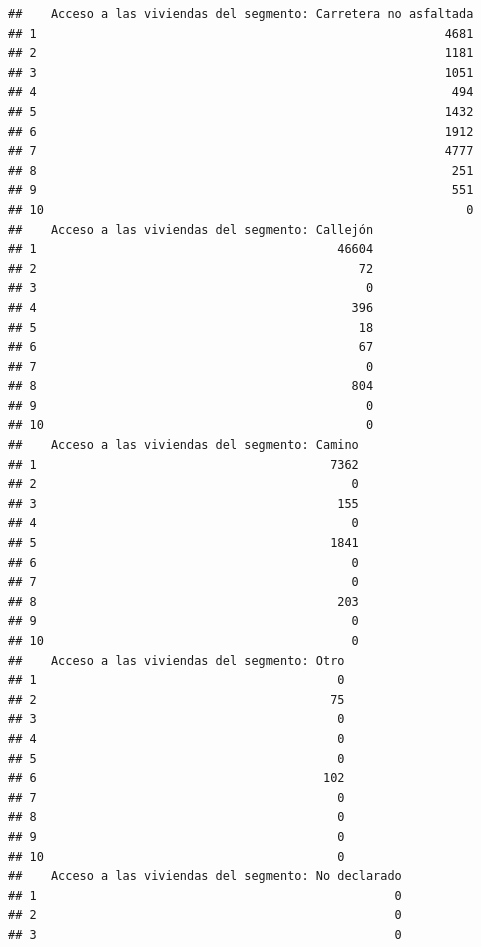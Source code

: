\documentclass[11pt,]{article}
\begin{document}
\begin{verbatim}
##    Acceso a las viviendas del segmento: Carretera no asfaltada
## 1                                                         4681
## 2                                                         1181
## 3                                                         1051
## 4                                                          494
## 5                                                         1432
## 6                                                         1912
## 7                                                         4777
## 8                                                          251
## 9                                                          551
## 10                                                           0
##    Acceso a las viviendas del segmento: Callejón
## 1                                          46604
## 2                                             72
## 3                                              0
## 4                                            396
## 5                                             18
## 6                                             67
## 7                                              0
## 8                                            804
## 9                                              0
## 10                                             0
##    Acceso a las viviendas del segmento: Camino
## 1                                         7362
## 2                                            0
## 3                                          155
## 4                                            0
## 5                                         1841
## 6                                            0
## 7                                            0
## 8                                          203
## 9                                            0
## 10                                           0
##    Acceso a las viviendas del segmento: Otro
## 1                                          0
## 2                                         75
## 3                                          0
## 4                                          0
## 5                                          0
## 6                                        102
## 7                                          0
## 8                                          0
## 9                                          0
## 10                                         0
##    Acceso a las viviendas del segmento: No declarado
## 1                                                  0
## 2                                                  0
## 3                                                  0

\end{verbatim}
\end{document}
